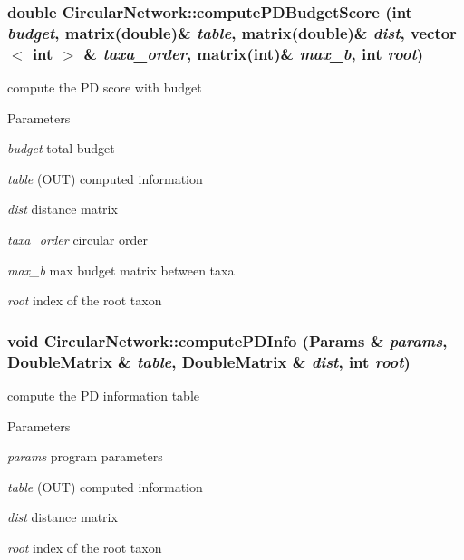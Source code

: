 \hypertarget{classCircularNetwork_a7656f85224812c604e818c4448ac79cf}{
\subsubsection[{computePDBudgetScore}]{\setlength{\rightskip}{0pt plus 5cm}double CircularNetwork::computePDBudgetScore (int {\em budget}, \/  matrix(double)\& {\em table}, \/  matrix(double)\& {\em dist}, \/  vector$<$ int $>$ \& {\em taxa\_\-order}, \/  matrix(int)\& {\em max\_\-b}, \/  int {\em root})}}
\label{classCircularNetwork_a7656f85224812c604e818c4448ac79cf}
compute the PD score with budget 
\begin{DoxyParams}{Parameters}
\item[{\em budget}]total budget \item[{\em table}](OUT) computed information \item[{\em dist}]distance matrix \item[{\em taxa\_\-order}]circular order \item[{\em max\_\-b}]max budget matrix between taxa \item[{\em root}]index of the root taxon \end{DoxyParams}
\hypertarget{classCircularNetwork_acb433def7804457703524e09beea5848}{
\subsubsection[{computePDInfo}]{\setlength{\rightskip}{0pt plus 5cm}void CircularNetwork::computePDInfo ({\bf Params} \& {\em params}, \/  DoubleMatrix \& {\em table}, \/  DoubleMatrix \& {\em dist}, \/  int {\em root})}}
\label{classCircularNetwork_acb433def7804457703524e09beea5848}
compute the PD information table 
\begin{DoxyParams}{Parameters}
\item[{\em params}]program parameters \item[{\em table}](OUT) computed information \item[{\em dist}]distance matrix \item[{\em root}]index of the root taxon \end{DoxyParams}
